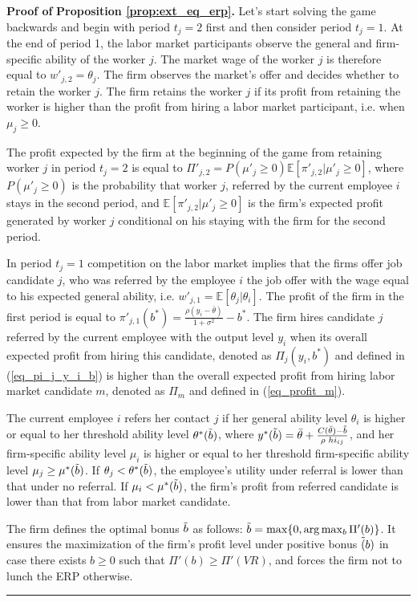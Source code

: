\documentclass[12pt]{article}
\newenvironment{proof}[1][Proof of]{\noindent\textbf{#1} }{\ \rule{0.5em}{0.5em}}
\begin{document}
\begin{proof}
    \textbf{Proposition \ref{prop:ext_eq_erp}.}
    Let's start solving the game backwards and begin with period $t_j = 2$ first and then consider period $t_j = 1$. At the end of period 1, the labor market participants observe the general and firm-specific ability of the worker $j$. The market wage of the worker $j$ is therefore equal to $w'_{j,2} = \theta_j$. The firm observes the market's offer and decides whether to retain the worker $j$. The firm retains the worker $j$ if its profit from retaining the worker is higher than the profit from hiring a labor market participant, i.e. when  $\mu_j \geq 0$. 
    
    The profit expected by the firm at the beginning of the game from retaining worker $j$ in period $t_j = 2$ is equal to $\Pi'_{j,2} = P(\mu'_j \geq 0)\mathbb{E}[\pi'_{j,2}|\mu'_j \geq 0]$, where $P(\mu'_j \geq 0)$ is the probability that worker $j$, referred by the current employee $i$ stays in the second period, and $\mathbb{E}[\pi'_{j,2}|\mu'_j \geq 0]$ is the firm's expected profit generated by worker $j$ conditional on his staying with the firm for the second period.  
    
    In period $t_j = 1$ competition on the labor market implies that the firms offer job candidate $j$, who was referred by the employee $i$ the job offer with the wage equal to his expected general ability, i.e. $w'_{j,1} = \mathbb{E}[\theta_j| \theta_i]$. The profit of the firm in the first period is equal to $\pi'_{j,1}(b^*) = \frac{\rho(y_i - \bar{\theta})}{1+\sigma^2}-b^*$. The firm hires candidate $j$ referred by the current employee with the output level $y_i$ when its overall expected profit from hiring this candidate, denoted as $\Pi_j(y_i, b^*)$ and defined in (\ref{eq_pi_j_y_i_b}) is higher than the overall expected profit from hiring labor market candidate $m$, denoted as $\Pi_m$ and defined in (\ref{eq_profit_m}).

    The current employee $i$ refers her contact $j$ if her general ability level $\theta_i$ is higher or equal to her threshold ability level $\theta^*(\Tilde{b})$, where $y^*(\Tilde{b}) = \bar{\theta} + \frac{C(\bar{\theta}) - \Tilde{b}}{\rho\\hi_{ij}}$, and her firm-specific ability level $\mu_i$ is higher or equal to her threshold firm-specific ability level $\mu_j \geq \mu^*(\Tilde{b})$. If $\theta_j < \theta^*(\Tilde{b})$, the employee's utility under referral is lower than that under no referral. If $\mu_i < \mu^*(\Tilde{b})$, the firm's profit from referred candidate is lower than that from labor market candidate.

    The firm defines the optimal bonus $\Tilde{b}$ as follows: $\Tilde{b}=\max\{0,\arg\max_{b}\Pi'(b)\}$. It ensures the maximization of the firm's profit level under positive bonus $\Tilde(b)$ in case there exists $b \geq 0$ such that $\Pi'(b) \geq \Pi'(VR)$, and forces the firm not to lunch the ERP otherwise.
\end{proof}
\end{document}
